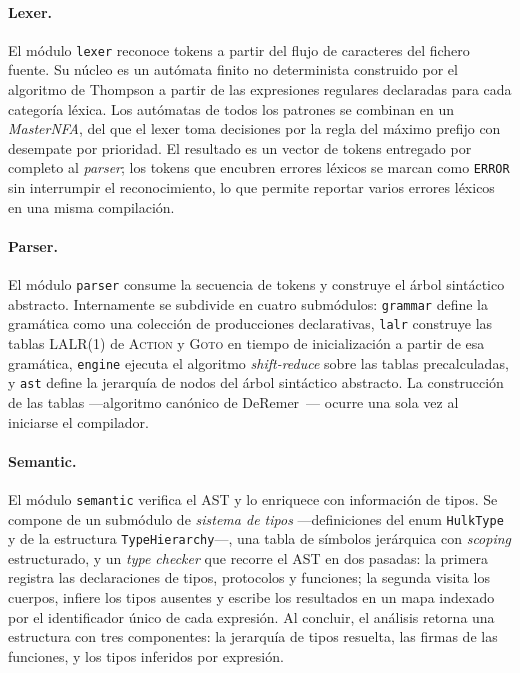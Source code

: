 \documentclass[11pt,a4paper,oneside,openany]{report}
\newcommand{\code}[1]{\texttt{#1}}
\begin{document}
\paragraph{Lexer.} El módulo \code{lexer} reconoce tokens a partir del flujo
de caracteres del fichero fuente. Su núcleo es un autómata finito no
determinista construido por el algoritmo de Thompson a partir de las
expresiones regulares declaradas para cada categoría léxica. Los autómatas
de todos los patrones se combinan en un \emph{MasterNFA}, del que el lexer
toma decisiones por la regla del máximo prefijo con desempate por prioridad.
El resultado es un vector de tokens entregado por completo al
\textit{parser}; los tokens que encubren errores léxicos se marcan como
\code{ERROR} sin interrumpir el reconocimiento, lo que permite reportar
varios errores léxicos en una misma compilación.

\paragraph{Parser.} El módulo \code{parser} consume la secuencia de tokens y
construye el árbol sintáctico abstracto. Internamente se subdivide en cuatro
submódulos: \code{grammar} define la gramática como una colección de
producciones declarativas, \code{lalr} construye las tablas LALR(1) de
\textsc{Action} y \textsc{Goto} en tiempo de inicialización a partir de esa
gramática, \code{engine} ejecuta el algoritmo \textit{shift-reduce} sobre las
tablas precalculadas, y \code{ast} define la jerarquía de nodos del árbol
sintáctico abstracto. La construcción de las tablas ---algoritmo canónico de
DeRemer~\cite{deremer1969}--- ocurre una sola vez al iniciarse el
compilador.

\paragraph{Semantic.} El módulo \code{semantic} verifica el AST y lo enriquece
con información de tipos. Se compone de un submódulo de \emph{sistema de
tipos} ---definiciones del enum \code{HulkType} y de la estructura
\code{TypeHierarchy}---, una tabla de símbolos jerárquica con
\textit{scoping} estructurado, y un \emph{type checker} que recorre el AST
en dos pasadas: la primera registra las declaraciones de tipos, protocolos
y funciones; la segunda visita los cuerpos, infiere los tipos ausentes y
escribe los resultados en un mapa indexado por el identificador único de
cada expresión. Al concluir, el análisis retorna una estructura con tres
componentes: la jerarquía de tipos resuelta, las firmas de las funciones, y
los tipos inferidos por expresión.
\end{document}
